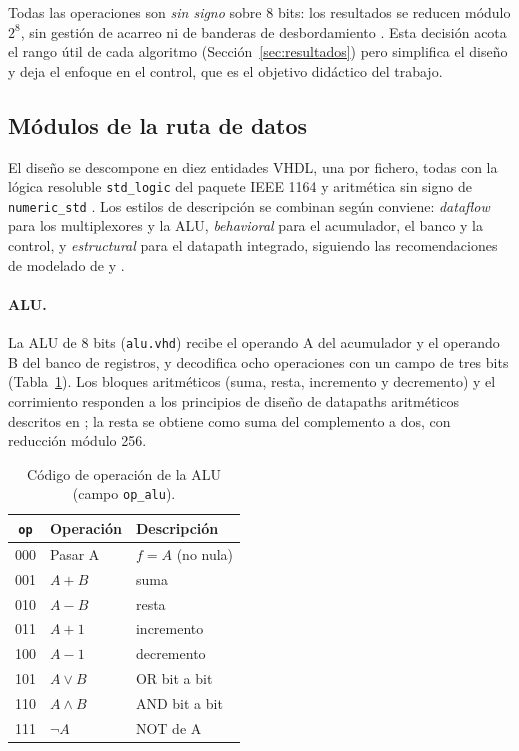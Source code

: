\documentclass[llncs]{llncs}
\begin{document}
Todas las operaciones son \emph{sin signo} sobre 8 bits: los resultados
se reducen módulo $2^8$, sin gestión de acarreo ni de banderas de
desbordamiento \cite{patterson2017cod}. Esta decisión acota el rango
útil de cada algoritmo (Sección~\ref{sec:resultados}) pero simplifica el
diseño y deja el enfoque en el control, que es el objetivo didáctico del
trabajo.

\subsection{Módulos de la ruta de datos}
\label{sec:modulos}

El diseño se descompone en diez entidades VHDL, una por fichero, todas
con la lógica resoluble \texttt{std\_logic} del paquete IEEE 1164
\cite{ieee1164_1993} y aritmética sin signo de \texttt{numeric\_std}
\cite{ashenden2008vhdl}. Los estilos de descripción se combinan según
conviene: \emph{dataflow} para los multiplexores y la ALU,
\emph{behavioral} para el acumulador, el banco y la control, y
\emph{estructural} para el datapath integrado, siguiendo las
recomendaciones de modelado de \cite{navabi1998vhdl} y
\cite{brown2009fdld}.

\paragraph{ALU.}
La ALU de 8 bits (\texttt{alu.vhd}) recibe el operando A del acumulador
y el operando B del banco de registros, y decodifica ocho operaciones
con un campo de tres bits (Tabla~\ref{tab:alu}). Los bloques
aritméticos (suma, resta, incremento y decremento) y el corrimiento
responden a los principios de diseño de datapaths aritméticos descritos
en \cite{rabaey2002dic}; la resta se obtiene como suma del complemento
a dos, con reducción módulo 256.

\begin{table}[t]
\centering
\caption{Código de operación de la ALU (campo \texttt{op\_alu}).}
\label{tab:alu}
\begin{tabular}{cll}
\hline
\texttt{op} & Operación & Descripción \\
\hline
000 & Pasar A     & $f = A$ (no nula) \\
001 & $A + B$     & suma \\
010 & $A - B$     & resta \\
011 & $A + 1$     & incremento \\
100 & $A - 1$     & decremento \\
101 & $A \lor B$  & OR bit a bit \\
110 & $A \land B$ & AND bit a bit \\
111 & $\lnot A$   & NOT de A \\
\hline
\end{tabular}
\end{table}
\end{document}
